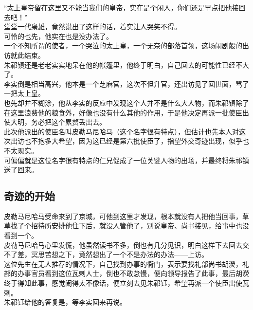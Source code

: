 \begin{multicols}{\theparacolNo}
“太上皇帝留在这里又不能当我们的皇帝，实在是个闲人，你们还是早点把他接回去吧！”\\

堂堂一代枭雄，竟然说出了这样的话，着实让人哭笑不得。\\

可怜的也先，他实在也是没办法了。\\

一个不知所谓的使者，一个哭泣的太上皇，一个无奈的部落首领，这场闹剧般的出访就此结束。\\

朱祁镇还是老老实实地呆在他的帐篷里，他终于明白，自己回去的可能性已经不大了。\\

李实倒是相当高兴，他本是一个芝麻官，这次不但升官，还出访见了回世面，骂了一把太上皇。\\

也先却并不糊涂，他从李实的反应中发现这个人并不是什么大人物，而朱祁镇除了在这里浪费他的粮食外，好像也没有什么其他的作用，于是他决定再派一批使臣出使大明，务必把这个累赘丢出去。\\

此次他派出的使臣名叫皮勒马尼哈马（这个名字很有特点），但估计也先本人对这次出访也不抱多大希望，因为这已经是第六批使臣了，指望外交奇迹出现，似乎也不太现实。\\

可偏偏就是这位名字很有特点的仁兄促成了一位关键人物的出场，并最终将朱祁镇送了回来。\\

\subsection{奇迹的开始}
皮勒马尼哈马受命来到了京城，可他到这里才发现，根本就没有人把他当回事，草草找了个招待所安排他住下后，就没人管他了，别说皇帝、尚书接见，给事中也没看到一个。\\

皮勒马尼哈马心里发慌，他虽然读书不多，倒也有几分见识，明白这样下去回去交不了差，冥思苦想之下，竟然想出了一个不是办法的办法——上访。\\

这位先生在无人推荐的情况下，自己找到办事的衙门，表示要找礼部尚书胡濙，礼部的办事官员看到这位瓦剌人士，倒也不敢怠慢，便向领导报告了此事，最后胡濙终于得知此事，感觉闹得太不像话，便立刻去见朱祁钰，希望再派一个使臣出使瓦剌。\\

朱祁钰给他的答复是，等李实回来再说。\\


\end{multicols}
